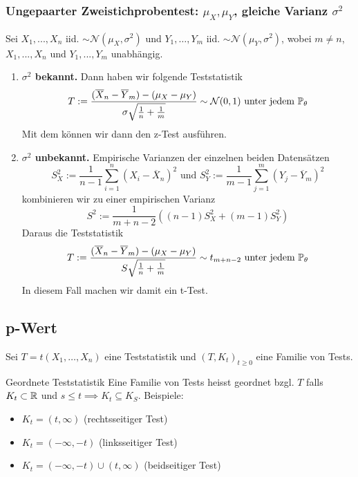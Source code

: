 \subsubsection*{Ungepaarter Zweistichprobentest: $\mu_X, \mu_Y$, gleiche Varianz $\sigma^2$}
Sei $X_1, ..., X_n$ iid. $\sim \mathcal{N}(\mu_X, \sigma^2)$ und $Y_1, \dots, Y_m$ iid. $\sim \mathcal{N}(\mu_Y, \sigma^2)$, wobei $m \neq n$, $X_1, ..., X_n$ und  $Y_1, ..., Y_m$ unabhängig.
\begin{enumerate}
	\item \textbf{$\sigma^2$ bekannt.} Dann haben wir folgende Teststatistik
	\[T := \frac{(\overline{X}_n -\overline{Y}_m) - (\mu_X - \mu_Y)}{\sigma\sqrt{\frac{1}{n}+\frac{1}{m}}} \sim \mathcal{N}(0,1) \text{ unter jedem }\P_{\theta}\]
	Mit dem können wir dann den z-Test ausführen.
	\item \textbf{$\sigma^2$ unbekannt.} Empirische Varianzen der einzelnen beiden Datensätzen
	\[S^2_X := \frac{1}{n-1}\sum_{i=1}^n(X_i - \overline{X}_n)^2 \text{ und } S^2_Y := \frac{1}{m-1}\sum_{j=1}^m(Y_j - \overline{Y}_m)^2\]
	kombinieren wir zu einer empirischen Varianz
	\[S^2 := \frac{1}{m+n-2}((n-1)S^2_X + (m-1)S_Y^2)\]
	Daraus die Teststatistik
	\[T := \frac{(\overline{X}_n -\overline{Y}_m) - (\mu_X - \mu_Y)}{S\sqrt{\frac{1}{n}+\frac{1}{m}}} \sim t_{m+n-2} \text{ unter jedem }\P_{\theta}\]
	In diesem Fall machen wir damit ein t-Test.
\end{enumerate}
\subsection{p-Wert}
Sei \(T = t(X_1, \ldots, X_n)\) eine Teststatistik und \((T,K_t)_{t\ge 0}\) eine Familie von Tests.

\begin{subbox}{Geordnete Teststatistik}
	Eine Familie von Tests heisst geordnet bzgl. \(T\) falls \(K_t \subset \R\) und \(s \le t \implies K_t \subseteq K_S\). Beispiele:
	\begin{itemize}
		\item \(K_t = (t, \infty)\) (rechtsseitiger Test)
		\item \(K_t = (-\infty, -t)\) (linksseitiger Test)
		\item \(K_t = (-\infty, -t) \cup (t, \infty)\) (beidseitiger Test)
	\end{itemize}
\end{subbox}

